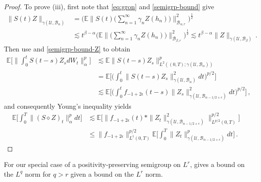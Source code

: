 \documentclass[final]{amsart}
\numberwithin{thm}{section}
\numberwithin{equation}{section}
\newcommand{\E}{\mathbb{E}}
\newcommand{\U}{\mathcal{U}}
\newcommand{\B}{\mathcal{B}}
\begin{document}
\begin{proof}
   To prove (iii), first note that \eqref{eq:gron} and \eqref{semigrp-bound} give
  \begin{equation}
  \begin{aligned}
  \label{semigrp-bound-Z}
        \|S(t)Z\|_{\gamma(\U, \B_\alpha)} 
        &= \Big(\E \Big\| S(t) \Big(\sum_{n =1}^\infty \gamma_n Z(h_n) \Big)\Big\|_{\B_{\alpha,r}}^2\Big)^{\frac{1}{2}} 
        \\
        &\lesssim t^{\beta - \alpha}
        \Big(\E \Big\|\Big(\sum_{n =1}^\infty \gamma_n Z(h_n) \Big)\Big\|_{\B_{\beta,r}}^2\Big)^{\frac{1}{2}}  
        \lesssim t^{\beta - \alpha}\|Z\|_{\gamma(\U,\B_\beta)} \,.
    \end{aligned}
    \end{equation}   
 Then use  \cite[Corollary 3.10]{umd-integration} and 
   \eqref{semigrp-bound-Z} to obtain
    \begin{align*}
        \E\Big[\Big\|\int_0^t S(t-s)Z_s dW_t\Big\|^p_\alpha\Big] &\lesssim \E\|S(t-s)Z_s\|^p_{L^2((0,T);\gamma(\U,\B_\alpha))} \\
        &= \E\Big[\Big(\int_0^t \|S(t-s)Z_s\|^2_{\gamma(\U,\B_\alpha)} dt\Big)^{p/2}\Big] \\
        &\lesssim \E\Big[\Big(\int_0^t f_{-1 + 2\epsilon}(t-s)\|Z_s\|^2_{\gamma(\U,\B_{\alpha-1/2+\epsilon})} dt\Big)^{p/2}\Big] \,,
    \end{align*}
and consequently Young's inequality yields
    \begin{align*}
        \E\Big[\int_0^T \|(S \diamond Z)_t\|^p_\alpha dt\Big] &\lesssim \E\Big[\Big\|f_{-1+2\epsilon}(t) * \|Z_t\|^2_{\gamma(\U,\B_{\alpha-1/2+\epsilon})}\Big\|_{L^{p/2}(0,T)}^{p/2}\Big] \\
        &\leq \Big\|f_{-1+2\epsilon}\Big\|_{L^{1}(0,T)}^{p/2}\E\Big[\int_0^T \|Z_t\|^p_{\gamma(\U,\B_{\alpha - 1/2 + \epsilon})} dt\Big] \,.
    \end{align*}
\end{proof}

For our special case of a positivity-preserving semigroup on $L^r$,  gives a bound on the $L^q$ norm for $q > r$ given a bound on the $L^r$ norm.
\end{document}
